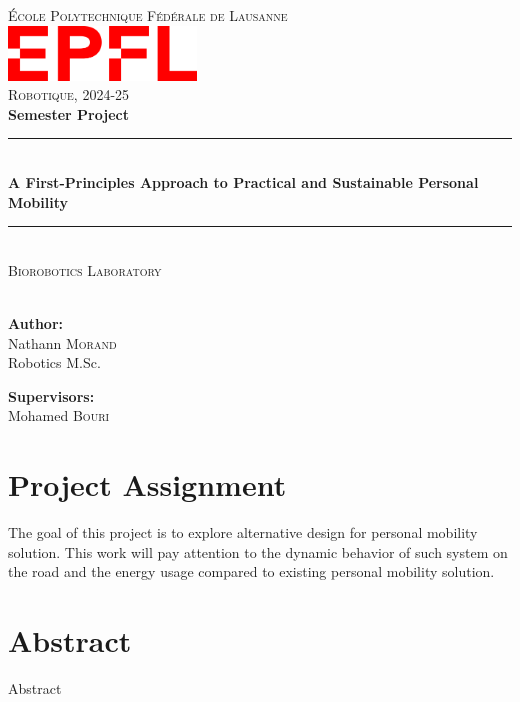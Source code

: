\documentclass[a4paper, 11 pt]{article}
\begin{document}
\thispagestyle{empty}
\begin{center}
    \newcommand{\HRule}{\rule{\linewidth}{0.5mm}}
    
    \textsc{\LARGE École Polytechnique Fédérale de Lausanne}\\[0.5cm]
    \includegraphics[width=5cm]{Figures/epfl_red.png}\\[0.5cm]
    \LARGE{\textsc{Robotique, 2024-25}}\\[0.5cm]
    \huge{\textbf{Semester Project}}
    
    \HRule \\[0.4cm]
    {\huge \bfseries A First-Principles Approach to Practical and Sustainable Personal Mobility}\\[0.1cm]
    \HRule \\[0.5cm]
    \LARGE{\textsc{Biorobotics Laboratory} \\
    }\\[0.5cm]
    
    \vspace{5mm}
    \vspace{15mm}
    
    \begin{minipage}{2in} \Large
    \textbf{Author:}\\
    Nathann \textsc{Morand}\\
    Robotics M.Sc.
    \end{minipage}
    \hfill
    \begin{minipage}{2.1in} \Large
    \textbf{Supervisors:}\\
    Mohamed \textsc{Bouri} \\
    \end{minipage}
\end{center}

\newpage
\renewcommand{\contentsname}{Table of Contents} 
{
  \hypersetup{linkcolor=black}
  \tableofcontents
}
\newpage

{ %

\section*{Project Assignment}
The goal of this project is to explore alternative design for personal mobility solution. This work will pay attention to the dynamic behavior of such system on the road and the energy usage compared to existing personal mobility solution.
\section*{Abstract}
Abstract
    
\newpage
}
\end{document}
